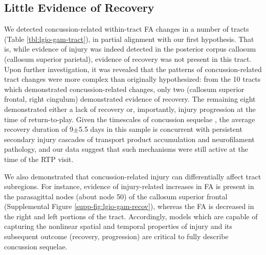 \documentclass[12pt]{article}
\begin{document}
\subsection{Little Evidence of Recovery}
\label{ssec:disc-evid}
We detected concussion-related within-tract FA changes in a number of tracts (Table \ref{tbl:lgio-gam-tract}), in partial alignment with our first hypothesis. That is, while evidence of injury was indeed detected in the posterior corpus callosum (callosum superior parietal), evidence of recovery was not present in this tract. Upon further investigation, it was revealed that the patterns of concussion-related tract changes were more complex than originally hypothesized: from the 10 tracts which demonstrated concussion-related changes, only two (callosum superior frontal, right cingulum) demonstrated evidence of recovery. The remaining eight demonstrated either a lack of recovery or, importantly, injury progression at the time of return-to-play. Given the timescales of concussion sequelae \parencite{krieg2023IdentifyingPhenotypesDiffuse}, the average recovery duration of 9$\pm$5.5 days in this sample is concurrent with persistent secondary injury cascades of transport product accumulation and neurofilament pathology, and our data suggest that such mechanisms were still active at the time of the RTP visit.

We also demonstrated that concussion-related injury can differentially affect tract subregions. For instance, evidence of injury-related increases in FA is present in the parasagittal nodes (about node 50) of the callosum superior frontal (Supplemental Figure \ref{supp-fig:lgio-gam-recov}), whereas the FA is decreased in the right and left portions of the tract. Accordingly, models which are capable of capturing the nonlinear spatial and temporal properties of injury and its subsequent outcome (recovery, progression) are critical to fully describe concussion sequelae.

\end{document}
